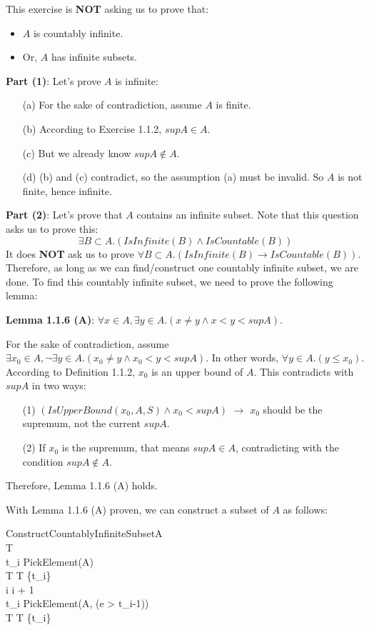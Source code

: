 \documentclass[12pt, letterpaper, oneside]{book}
\begin{document}
This exercise is \textbf{NOT} asking us to prove that:
\begin{itemize}
  \item $A$ is countably infinite.
  \item Or, $A$ has infinite subsets.
\end{itemize}

\textbf{Part (1)}: Let's prove $A$ is infinite:
\begin{enumerate}
  \item[(a)] For the sake of contradiction, assume $A$ is finite.
  \item[(b)] According to Exercise 1.1.2, $sup A \in A$.
  \item[(c)] But we already know $sup A \notin A$.
  \item[(d)] (b) and (c) contradict, so the assumption (a) must be invalid. So $A$ is not finite, hence infinite.
\end{enumerate}

\textbf{Part (2)}: Let's prove that $A$ contains an infinite subset. Note that this question asks us to prove this:
\[\exists B \subset A. (IsInfinite(B) \land IsCountable(B))\]
It does \textbf{NOT} ask us to prove $\forall B \subset A. (IsInfinite(B) \rightarrow IsCountable(B))$. Therefore, as
long as we can find/construct one countably infinite subset, we are done. To find this countably infinite subset, we
need to prove the following lemma:

\textbf{Lemma 1.1.6 (A)}: $\forall x \in A, \exists y \in A. (x \ne y \land x < y < sup A)$.

For the sake of contradiction, assume $\exists x_0 \in A, \lnot \exists y \in A. (x_0 \ne y \land x_0 < y < sup A)$. In
other words, $\forall y \in A. (y \leqslant x_0)$. According to Definition 1.1.2, $x_0$ is an upper bound of $A$. This
contradicts with $sup A$ in two ways:
\begin{enumerate}
  \item[(1)] $(IsUpperBound(x_0, A, S) \land x_0 < sup A)$ $\rightarrow$ $x_0$ should be the supremum, not the current
        $sup A$.
  \item[(2)] If $x_0$ is the supremum, that means $sup A \in A$, contradicting with the condition $sup A \notin A$.
\end{enumerate}

Therefore, Lemma 1.1.6 (A) holds.

With Lemma 1.1.6 (A) proven, we can construct a subset of $A$ as follows:

\begin{pseudocode}[ruled]{ConstructCountablyInfiniteSubset}{A}
   \\
  T \GETS \emptyset \\
  t_i \GETS PickElement(A) \\
  T \GETS T \cup \{t_i\} \\
  \WHILE \TRUE \DO
  \BEGIN
  i \GETS i + 1 \\
  t_i \GETS PickElement(A, (e > t_{i-1})) \\
  T \GETS T \cup \{t_i\} \\
  \END
  \\
\end{pseudocode}
\end{document}
